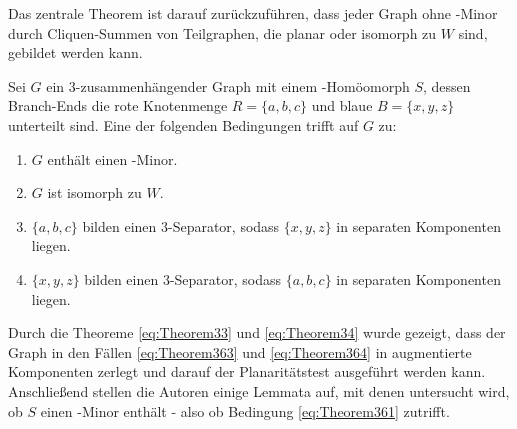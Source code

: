 Das zentrale Theorem ist darauf zurückzuführen, dass jeder Graph ohne \kf-Minor durch Cliquen-Summen von Teilgraphen, die planar oder isomorph zu $W$ sind, gebildet werden kann.\cite{Wag37}
\begin{theorem}\label{eq:Theorem36}
  Sei $G$ ein $3$-zusammenhängender Graph mit einem \kdd-Homöomorph $S$, dessen Branch-Ends die rote Knotenmenge $R = \{a, b, c\}$ und blaue $B = \{x, y, z\}$ unterteilt sind.
  Eine der folgenden Bedingungen trifft auf $G$ zu:
  \begin{enumerate}
    \item $G$ enthält einen \kf-Minor.\label{eq:Theorem361}
    \item $G$ ist isomorph zu $W$.\label{eq:Theorem362}
    \item $\{a, b, c\}$ bilden einen $3$-Separator, sodass $\{x, y, z\}$ in separaten Komponenten liegen.\label{eq:Theorem363}
    \item $\{x, y, z\}$ bilden einen $3$-Separator, sodass $\{a, b, c\}$ in separaten Komponenten liegen.\label{eq:Theorem364}
  \end{enumerate}
\end{theorem}
Durch die Theoreme \ref{eq:Theorem33} und \ref{eq:Theorem34} wurde gezeigt, dass der Graph in den Fällen \ref{eq:Theorem363} und \ref{eq:Theorem364} in augmentierte Komponenten zerlegt und darauf der Planaritätstest ausgeführt werden kann.
Anschließend stellen die Autoren einige Lemmata auf, mit denen untersucht wird, ob $S$ einen \kf-Minor enthält - also ob Bedingung \ref{eq:Theorem361} zutrifft.

